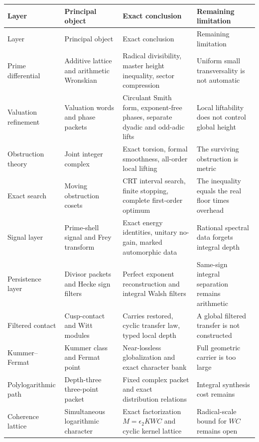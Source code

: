 \begingroup\footnotesize\setlength{\tabcolsep}{3pt}
\begin{longtable}{L{0.17\textwidth}L{0.22\textwidth}L{0.29\textwidth}L{0.23\textwidth}}
\toprule
Layer & Principal object & Exact conclusion & Remaining limitation\\
\midrule
\endfirsthead
\toprule
Layer & Principal object & Exact conclusion & Remaining limitation\\
\midrule
\endhead
Prime differential & Additive lattice and arithmetic Wronskian & Radical divisibility, master height inequality, sector compression & Uniform small transversality is not automatic\\
Valuation refinement & Valuation words and phase packets & Circulant Smith form, exponent-free phases, separate dyadic and odd-adic lifts & Local liftability does not control global height\\
Obstruction theory & Joint integer complex & Exact torsion, formal smoothness, all-order local lifting & The surviving obstruction is metric\\
Exact search & Moving obstruction cosets & CRT interval search, finite stopping, complete first-order optimum & The inequality equals the real floor times overhead\\
Signal layer & Prime-shell signal and Frey transform & Exact energy identities, unitary no-gain, marked automorphic data & Rational spectral data forgets integral depth\\
Persistence layer & Divisor packets and Hecke sign filters & Perfect exponent reconstruction and integral Walsh filters & Same-sign integral separation remains arithmetic\\
Filtered contact & Cusp-contact and Witt modules & Carries restored, cyclic transfer law, typed local depth & A global filtered transfer is not constructed\\
Kummer--Fermat & Kummer class and Fermat point & Near-lossless globalization and exact character bank & Full geometric carrier is too large\\
Polylogarithmic path & Depth-three three-point packet & Fixed complex packet and exact distribution relations & Integral synthesis cost remains\\
Coherence lattice & Simultaneous logarithmic character & Exact factorization $M=\epsilon_2KWC$ and cyclic kernel lattice & Radical-scale bound for $WC$ remains open\\
\bottomrule
\end{longtable}
\endgroup

